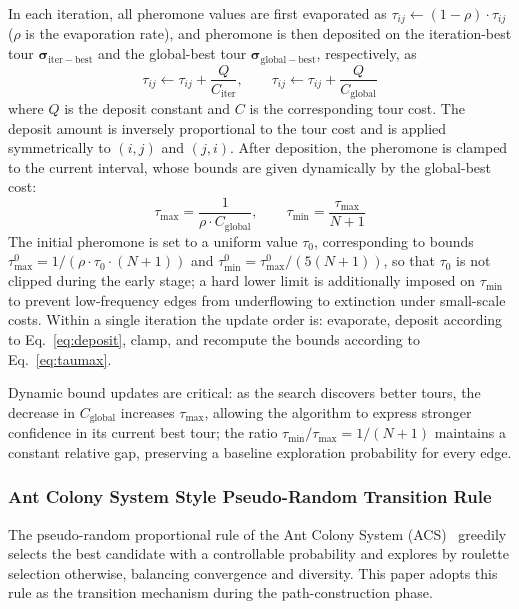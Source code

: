 In each iteration, all pheromone values are first evaporated as $\tau_{ij} \leftarrow (1 - \rho) \cdot \tau_{ij}$ ($\rho$ is the evaporation rate), and pheromone is then deposited on the iteration-best tour $\bm{\sigma}_{\mathrm{iter-best}}$ and the global-best tour $\bm{\sigma}_{\mathrm{global-best}}$, respectively, as
\begin{equation}
\tau_{ij} \leftarrow \tau_{ij} + \frac{Q}{C_{\mathrm{iter}}}, \qquad
\tau_{ij} \leftarrow \tau_{ij} + \frac{Q}{C_{\mathrm{global}}}
\label{eq:deposit}
\end{equation}
where $Q$ is the deposit constant and $C$ is the corresponding tour cost. The deposit amount is inversely proportional to the tour cost and is applied symmetrically to $(i,j)$ and $(j,i)$. After deposition, the pheromone is clamped to the current interval, whose bounds are given dynamically by the global-best cost:
\begin{equation}
\tau_{\max} = \frac{1}{\rho \cdot C_{\mathrm{global}}}, \qquad
\tau_{\min} = \frac{\tau_{\max}}{N+1}
\label{eq:taumax}
\end{equation}
The initial pheromone is set to a uniform value $\tau_0$, corresponding to bounds $\tau_{\max}^{0} = 1/(\rho \cdot \tau_0 \cdot (N+1))$ and $\tau_{\min}^{0} = \tau_{\max}^{0}/(5(N+1))$, so that $\tau_0$ is not clipped during the early stage; a hard lower limit is additionally imposed on $\tau_{\min}$ to prevent low-frequency edges from underflowing to extinction under small-scale costs. Within a single iteration the update order is: evaporate, deposit according to Eq.~\textcolor{blue}{\eqref{eq:deposit}}, clamp, and recompute the bounds according to Eq.~\textcolor{blue}{\eqref{eq:taumax}}.

Dynamic bound updates are critical: as the search discovers better tours, the decrease in $C_{\mathrm{global}}$ increases $\tau_{\max}$, allowing the algorithm to express stronger confidence in its current best tour; the ratio $\tau_{\min}/\tau_{\max} = 1/(N+1)$ maintains a constant relative gap, preserving a baseline exploration probability for every edge.

\subsubsection{Ant Colony System Style Pseudo-Random Transition Rule}

The pseudo-random proportional rule of the Ant Colony System (ACS)~\textcolor{blue}{\cite{ref22}} greedily selects the best candidate with a controllable probability and explores by roulette selection otherwise, balancing convergence and diversity. This paper adopts this rule as the transition mechanism during the path-construction phase.

